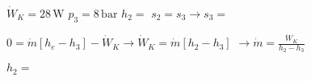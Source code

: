 \( \dot{W}_K = 28 \, \text{W} \)  
\( p_3 = 8 \, \text{bar} \)  
\( h_2 = \)  
\( s_2 = s_3 \rightarrow s_3 = \)  

\( 0 = \dot{m} [h_e - h_3] - \dot{W}_K \rightarrow \dot{W}_K = \dot{m} [h_2 - h_3] \)  
\( \rightarrow \dot{m} = \frac{\dot{W}_K}{h_2 - h_3} \)  

\( h_2 = \)